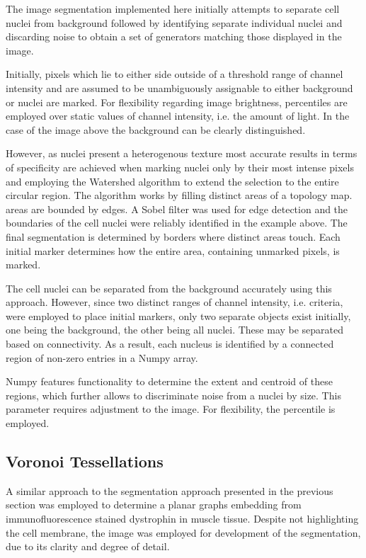 \documentclass[a4paper]{article}
\begin{document}
The image segmentation implemented here initially attempts to separate cell nuclei from background followed
by identifying separate individual nuclei and discarding noise to obtain a set of generators matching those displayed in
the image.

Initially, pixels which lie to either side outside of a threshold range of channel
intensity and are assumed to be unambiguously assignable to either background or nuclei are marked.
For flexibility regarding image
brightness, percentiles are employed over static values of channel intensity, i.e. the amount of light.
In the case of the image above the background can be clearly distinguished.

However, as nuclei present a heterogenous texture most accurate results in terms of specificity are achieved when
marking nuclei only by their most intense pixels and employing the Watershed algorithm to extend the selection
to the entire circular region. The algorithm works by filling distinct areas of a topology map.
areas are bounded by edges. A Sobel filter was used for edge detection and the boundaries
of the cell nuclei were reliably identified in the example above.
The final segmentation is determined by borders where distinct areas touch.
Each initial marker determines how the entire area, containing unmarked pixels, is marked.

The cell nuclei can be separated from the background accurately using this approach. However, since two distinct
ranges of channel intensity, i.e. criteria, were employed to place initial markers, only two separate objects exist
initially, one being the background, the other being all nuclei. These may be separated based on connectivity.
As a result, each nucleus is identified by a connected region of non-zero entries in a Numpy array.

Numpy features functionality to determine the extent and centroid of these regions, which further allows to discriminate
noise from a nuclei by size. This parameter requires adjustment to the image. For flexibility, the percentile is employed.

\subsection{Voronoi Tessellations}
A similar approach to the segmentation approach presented in the previous section was employed to
determine a planar graphs embedding from immunofluorescence stained dystrophin in muscle tissue.
Despite not highlighting the cell membrane, the image was employed for development of the segmentation,
due to its clarity and degree of detail.
\end{document}
